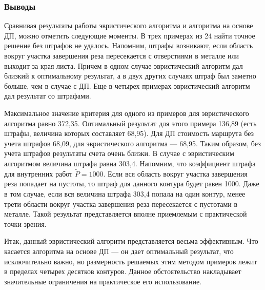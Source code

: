\subsubsection*{Выводы}

Сравнивая результаты работы эвристического алгоритма и
алгоритма на основе ДП, можно отметить следующие моменты.
В трех примерах из 24 найти точное решение без штрафов не удалось.
Напомним, штрафы возникают,
если область вокруг участка завершения реза пересекается с отверстиями в металле
или выходит за края листа.
Причем в одном случае эвристический алгоритм дал близкий к оптимальному результат,
а в двух других случаях штраф был заметно больше, чем в случае с ДП.
Еще в четырех примерах эвристический алгоритм дал
результат со штрафами.

Максимальное значение критерия для одного из примеров
для эвристического алгоритма равно 372,35.
Оптимальный результат для этого примера 136,89
(есть штрафы, величина которых составляет 68,95).
Для ДП стоимость маршрута без учета штрафов 68,09,
для эвристического алгоритма --- 68,95.
Таким образом, без учета штрафов результаты счета очень близки.
В случае с эвристическим алгоритмом величина штрафа равна 303,4.
Напомним, что коэффициент штрафа для внутренних работ $\tilde{P}=1000$.
Если вся область вокруг участка завершения реза попадает на пустоты,
то штраф для данного контура будет равен 1000.
Даже в том случае, если вся величина штрафа 303,4 попала на один контур,
менее трети области вокруг участка завершения реза пересекается с пустотами в металле.
Такой результат представляется вполне приемлемым с практической точки зрения.

Итак, данный эвристический алгоритм представляется весьма эффективным.
Что касается алгоритма на основе ДП --- он дает оптимальный результат,
что исключительно важно,
но размерность решаемых этим методом примеров лежит в пределах четырех десятков контуров.
Данное обстоятельство накладывает значительные ограничения на практическое его использование.
